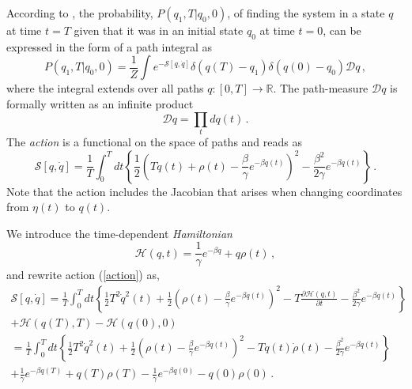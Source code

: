 \documentclass[11pt, a4paper]{article}
\newcommand{\dt}{\mathit{dt}}
\begin{document}


According to \cite{lau_2007_StateDepDiff}, the probability, $P(q_1,T|q_0,0)$, of finding the system in a state $q$ at time $t = T$ given that it was in an initial state $q_0$ at time $t = 0$, can be expressed in the form of a path integral as
\begin{equation}\label{pathint}
P(q_1,T|q_0,0) 
= 
\frac{1}{Z}
\int 
e^{-{\mathcal S}[q,\dot q]} 
\delta(q(T)-q_1)
\delta(q(0)-q_0)
\mathcal{D}q \,,
\end{equation}
where the integral extends over all paths $q:[0,T]\rightarrow \mathbb R$.
The path-measure $\mathcal Dq$ is formally written as an infinite product
\begin{equation}\label{pathmeasure_q}
{\mathcal Dq}
=
\prod_{t}
dq(t)\,.
\end{equation}
The {\em action} is a functional on the space of paths and reads as
\begin{equation}
{\mathcal S}[{q},\dot q]
=
\frac{1}{T}
\int_0^T \dt \left\{
\frac{1}{2}
\left(
    T\dot q(t)
    +
    \rho(t)
    -
    \frac{\beta}{\gamma}e^{-\beta q(t)}\right)^2
    -
    \frac{\beta^2}{2\gamma}e^{-\beta q(t)}
\right\} \,.
\end{equation}
Note that the action includes the Jacobian that arises when changing coordinates from ${\eta(t)}$ to $q(t)$.

We introduce the time-dependent {\em Hamiltonian}
\begin{equation}\label{H}
  \mathcal{H}(q,t)
  =
  \frac{1}{\gamma}e^{-\beta q}+q\rho(t)\,,
\end{equation}
and rewrite action (\ref{action}) as,
\begin{multline}\label{action}
{\mathcal S}[{q},\dot q]
=
\frac{1}{T}
\int_0^T dt\left\{
    \frac{1}{2}
    T^2\dot q^2(t) +
    \frac{1}{2}
    \left(\rho(t)-\frac{\beta}{\gamma}e^{-\beta q(t)}\right)^2 -
    T\frac{\partial \mathcal{H}(q,t)}{\partial t} -
    \frac{\beta^2}{2\gamma}e^{-\beta q(t)}
\right\}
\\
+ \mathcal{H}(q(T),T) - \mathcal{H}(q(0),0)
\\
= \frac{1}{T}
\int_0^T dt\left\{
    \frac{1}{2}
    T^2\dot q^2(t) +
    \frac{1}{2}
    \left(\rho(t)-\frac{\beta}{\gamma}e^{-\beta q(t)}\right)^2 -
    Tq(t)\dot\rho(t) -
     \frac{\beta^2}{2\gamma}e^{-\beta q(t)}
\right\}
\\
+
    \frac{1}{\gamma}e^{-\beta q(T)}+q(T)\rho(T)
   -\frac{1}{\gamma}e^{-\beta q(0)}-q(0)\rho(0)
\,.
\end{multline}
\end{document}
